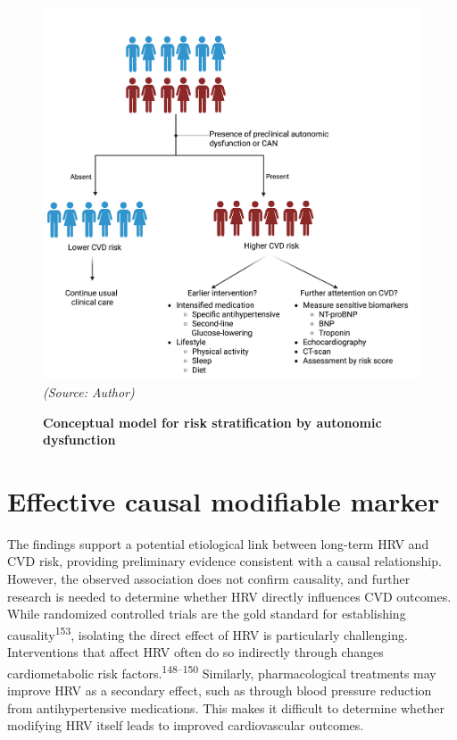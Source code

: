 \documentclass[
  a4paper,
  headsepline=true,
  open=left]{scrbook}
\begin{document}
\begin{figure}

{\centering 

\includegraphics{images/strafication_tree_of_CAN(1).png}\\
\emph{(Source: Author)}

}

\caption{\label{fig-rsp}\textbf{Conceptual model for risk stratification
by autonomic dysfunction}}

\end{figure}

\hypertarget{effective-causal-modifiable-marker}{%
\section{Effective causal modifiable
marker}\label{effective-causal-modifiable-marker}}

The findings support a potential etiological link between long-term HRV
and CVD risk, providing preliminary evidence consistent with a causal
relationship. However, the observed association does not confirm
causality, and further research is needed to determine whether HRV
directly influences CVD outcomes. While randomized controlled trials are
the gold standard for establishing causality\textsuperscript{153},
isolating the direct effect of HRV is particularly challenging.
Interventions that affect HRV often do so indirectly through changes
cardiometabolic risk factors.\textsuperscript{148--150} Similarly,
pharmacological treatments may improve HRV as a secondary effect, such
as through blood pressure reduction from antihypertensive medications.
This makes it difficult to determine whether modifying HRV itself leads
to improved cardiovascular outcomes.
\end{document}

